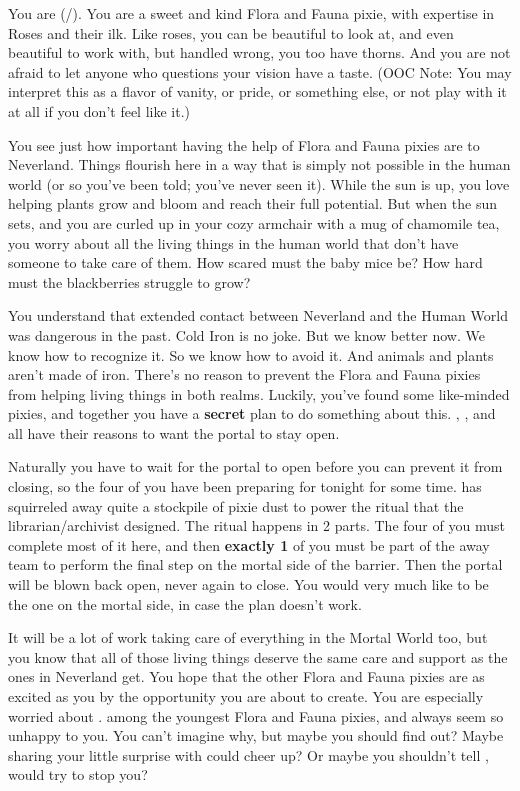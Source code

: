 \documentclass[char]{PP}
\begin{document}
\name{\cFHeart{}}

You are \cFHeart{} (\cFHeart{\They}/\cFHeart{\Them}). You are a sweet and kind Flora and Fauna pixie, with expertise in Roses and their ilk. Like roses, you can be beautiful to look at, and even beautiful to work with, but handled wrong, you too have thorns. And you are not afraid to let anyone who questions your vision have a taste. (OOC Note: You may interpret this as a flavor of vanity, or pride, or something else, or not play with it at all if you don’t feel like it.)

You see just how important having the help of Flora and Fauna pixies are to Neverland. Things flourish here in a way that is simply not possible in the human world (or so you’ve been told; you’ve never seen it). While the sun is up, you love helping plants grow and bloom and reach their full potential. But when the sun sets, and you are curled up in your cozy armchair with a mug of chamomile tea, you worry about all the living things in the human world that don’t have someone to take care of them. How scared must the baby mice be? How hard must the blackberries struggle to grow?

You understand that extended contact between Neverland and the Human World was dangerous in the past. Cold Iron is no joke. But we know better now. We know how to recognize it. So we know how to avoid it. And animals and plants aren’t made of iron. There’s no reason to prevent the Flora and Fauna pixies from helping living things in both realms. Luckily, you’ve found some like-minded pixies, and together you have a \textbf{secret} plan to do something about this. \cSLibrarian{}, \cESweet{}, and \cMIron{} all have their reasons to want the portal to stay open. 

Naturally you have to wait for the portal to open before you can prevent it from closing, so the four of you have been preparing for tonight for some time. \cMIron{} has squirreled away quite a stockpile of pixie dust to power the ritual that the librarian/archivist designed. The ritual happens in 2 parts. The four of you must complete most of it here, and then \textbf{exactly 1} of you must be part of the away team to perform the final step on the mortal side of the barrier. Then the portal will be blown back open, never again to close. You would very much like to be the one on the mortal side, in case the plan doesn’t work.

It will be a lot of work taking care of everything in the Mortal World too, but you know that all of those living things deserve the same care and support as the ones in Neverland get. You hope that the other Flora and Fauna pixies are as excited as you by the opportunity you are about to create. You are especially worried about \cFWanabe{}. \cFWanabe{\They} \cFWanabe{\are} among the youngest Flora and Fauna pixies, and \cFWanabe{\they} always seem\cFWanabe{\plural} so unhappy to you. You can’t imagine why, but maybe you should find out? Maybe sharing your little surprise with \cFWanabe{\them} could cheer \cFWanabe{\them} up? Or maybe you shouldn’t tell \cFWanabe{\them}, would \cFWanabe{\they} try to stop you?
\end{document}

